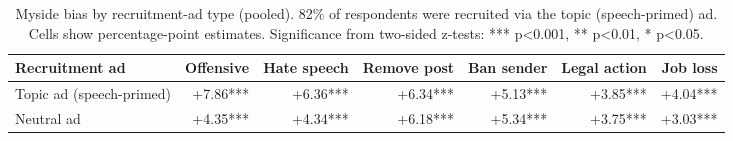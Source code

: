 \begin{table}

\caption{\label{tab:robustness-adtype}Myside bias by recruitment-ad type (pooled). 82\% of respondents were recruited via the topic (speech-primed) ad. Cells show percentage-point estimates. Significance from two-sided z-tests: *** p<0.001, ** p<0.01, * p<0.05.}
\centering
\begin{tabular}[t]{lrrrrrr}
\toprule
\textbf{Recruitment ad} & \textbf{Offensive} & \textbf{Hate speech} & \textbf{Remove post} & \textbf{Ban sender} & \textbf{Legal action} & \textbf{Job loss}\\
\midrule
Topic ad (speech-primed) & +7.86*** & +6.36*** & +6.34*** & +5.13*** & +3.85*** & +4.04***\\
Neutral ad & +4.35*** & +4.34*** & +6.18*** & +5.34*** & +3.75*** & +3.03***\\
\bottomrule
\end{tabular}
\end{table}
